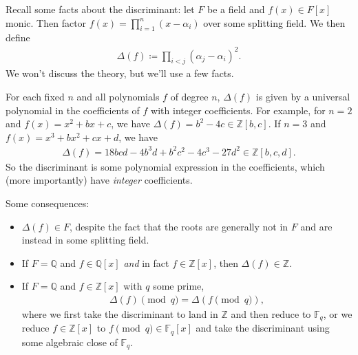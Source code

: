 \begin{remark}

Recall some facts about the discriminant: let \(F\) be a field and
\(f(x) \in F[x]\) monic. Then factor
\(f(x) = \prod_{i=1}^n (x - \alpha_i)\) over some splitting field. We
then define
\begin{align*}
{\Delta}(f) \coloneqq\prod_{i<j} ( \alpha_j - \alpha_i)^2
.\end{align*}
We won't discuss the theory, but we'll use a few facts.

\end{remark}

\begin{fact}

For each fixed \(n\) and all polynomials \(f\) of degree \(n\),
\({\Delta}(f)\) is given by a universal polynomial in the coefficients
of \(f\) with integer coefficients. For example, for \(n=2\) and
\(f(x) = x^2 + bx + c\), we have
\({\Delta}(f) = b^2 - 4c \in {\mathbb{Z}}[b,c]\). If \(n=3\) and
\(f(x) = x^3 + bx^2 + cx + d\), we have
\begin{align*}
{\Delta}(f) = 18bcd - 4b^3d + b^2c^2 - 4c^3 - 27d^2\in {\mathbb{Z}}[b,c,d]
.\end{align*}
So the discriminant is some polynomial expression in the coefficients,
which (more importantly) have \emph{integer} coefficients.

Some consequences:

\begin{itemize}
\tightlist
\item
  \({\Delta}(f) \in F\), despite the fact that the roots are generally
  not in \(F\) and are instead in some splitting field.
\item
  If \(F ={\mathbb{Q}}\) and \(f\in {\mathbb{Q}}[x]\) \emph{and} in fact
  \(f\in {\mathbb{Z}}[x]\), then \({\Delta}(f) \in {\mathbb{Z}}\).
\item
  If \(F = {\mathbb{Q}}\) and \(f\in {\mathbb{Z}}[x]\) with \(q\) some
  prime,
  \begin{align*}
  {\Delta}( f) \pmod q = {\Delta}(f \pmod q)
  ,\end{align*}
  where we first take the discriminant to land in \({\mathbb{Z}}\) and
  then reduce to \({\mathbb{F}}_q\), or we reduce
  \(f\in {\mathbb{Z}}[x]\) to \(f\pmod q \in {\mathbb{F}}_q[x]\) and
  take the discriminant using some algebraic close of
  \({\mathbb{F}}_q\).
\end{itemize}

\end{fact}


